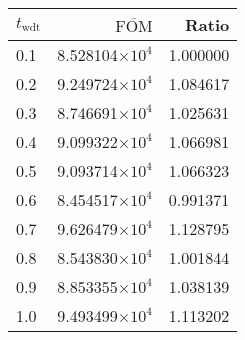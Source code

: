 \begin{tabular}{lrr}
\toprule
$t_{\mathrm{wdt}}$ & $\overline{\mathrm{FOM}}$ &    Ratio \\
\midrule
               0.1 &   8.528104$\times 10^{4}$ & 1.000000 \\
               0.2 &   9.249724$\times 10^{4}$ & 1.084617 \\
               0.3 &   8.746691$\times 10^{4}$ & 1.025631 \\
               0.4 &   9.099322$\times 10^{4}$ & 1.066981 \\
               0.5 &   9.093714$\times 10^{4}$ & 1.066323 \\
               0.6 &   8.454517$\times 10^{4}$ & 0.991371 \\
               0.7 &   9.626479$\times 10^{4}$ & 1.128795 \\
               0.8 &   8.543830$\times 10^{4}$ & 1.001844 \\
               0.9 &   8.853355$\times 10^{4}$ & 1.038139 \\
               1.0 &   9.493499$\times 10^{4}$ & 1.113202 \\
\bottomrule
\end{tabular}
